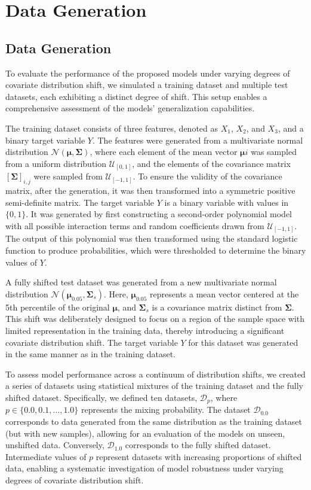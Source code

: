 \chapter{Data Generation}

\section{Data Generation}

To evaluate the performance of the proposed models under varying degrees of covariate distribution shift, we simulated a training dataset and multiple test datasets, each exhibiting a distinct degree of shift. 
This setup enables a comprehensive assessment of the models' generalization capabilities.

The training dataset consists of three features, denoted as $X_1$, $X_2$, and $X_3$, and a binary target variable $Y$. The features were generated from a multivariate normal distribution $\mathcal{N}(\boldsymbol{\mu}, \boldsymbol{\Sigma})$, where each element of the mean vector $\boldsymbol{\mu}i$ was sampled from a uniform distribution $\mathcal{U}_{[0, 1]}$, and the elements of the covariance matrix $[\boldsymbol{\Sigma}]_{i,j}$ were sampled from $\mathcal{U}_{[-1, 1]}$. To ensure the validity of the covariance matrix, after the generation, it was then transformed into a symmetric positive semi-definite matrix.
The target variable $Y$ is a binary variable with values in $\{0, 1\}$. It was generated by first constructing a second-order polynomial model with all possible interaction terms and random coefficients drawn from $\mathcal{U}_{[-1, 1]}$. The output of this polynomial was then transformed using the standard logistic function to produce probabilities, which were thresholded to determine the binary values of $Y$.

A fully shifted test dataset was generated from a new multivariate normal distribution $\mathcal{N}(\boldsymbol{\mu}_{0.05}, \boldsymbol{\Sigma}_s)$. Here, $\boldsymbol{\mu}_{0.05}$ represents a mean vector centered at the 5th percentile of the original $\boldsymbol{\mu}$, and $\boldsymbol{\Sigma}_s$ is a covariance matrix distinct from $\boldsymbol{\Sigma}$. This shift was deliberately designed to focus on a region of the sample space with limited representation in the training data, thereby introducing a significant covariate distribution shift. The target variable $Y$ for this dataset was generated in the same manner as in the training dataset.

To assess model performance across a continuum of distribution shifts, we created a series of datasets using statistical mixtures of the training dataset and the fully shifted dataset. Specifically, we defined ten datasets, $\mathcal{D}_p$, where $p \in \{0.0, 0.1, \ldots, 1.0\}$ represents the mixing probability. The dataset $\mathcal{D}_{0.0}$ corresponds to data generated from the same distribution as the training dataset (but with new samples), allowing for an evaluation of the models on unseen, unshifted data. Conversely, $\mathcal{D}_{1.0}$ corresponds to the fully shifted dataset. Intermediate values of $p$ represent datasets with increasing proportions of shifted data, enabling a systematic investigation of model robustness under varying degrees of covariate distribution shift.
